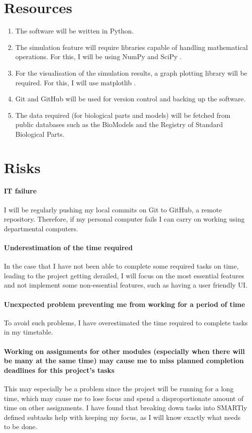 \documentclass{article}
\begin{document}
	\section{Resources}
	\begin{enumerate}
		\item The software will be written in Python.
		\item The simulation feature will require libraries capable of handling mathematical operations. For this, I will be using NumPy \cite{numpy} and SciPy \cite{scipy}.
		\item For the visualisation of the simulation results, a graph plotting library will be required. For this, I will use matplotlib \cite{matplotlib}.
		\item Git \cite{git} and GitHub \cite{github} will be used for version control and backing up the software.
		\item The data required (for biological parts and models) will be fetched from public databases such as the BioModels \cite{biomodels} and the Registry of Standard Biological Parts. \cite{rsbp}
	\end{enumerate}
	
	\section{Risks}
	\paragraph{IT failure} I will be regularly pushing my local commits on Git to GitHub, a remote repository. Therefore, if my personal computer fails I can carry on working using departmental computers.
	\paragraph{Underestimation of the time required} In the case that I have not been able to complete some required tasks on time, leading to the project getting derailed, I will focus on the most essential features and not implement some non-essential features, such as having a user friendly UI.
	\paragraph{Unexpected problem preventing me from working for a period of time} To avoid such problems, I have overestimated the time required to complete tasks in my timetable.
	\paragraph{Working on assignments for other modules (especially when there will be many at the same time) may cause me to miss planned completion deadlines for this project's tasks} This may especially be a problem since the project will be running for a long time, which may cause me to lose focus and spend a disproportionate amount of time on other assignments. I have found that breaking down tasks into SMARTly defined subtasks help with keeping my focus, as I will know exactly what needs to be done.
	
\end{document}
